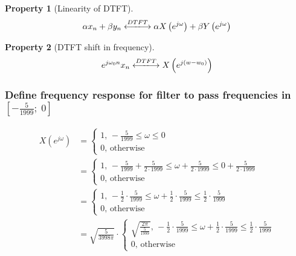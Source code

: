 \documentclass[a4paper]{article}
\theoremstyle{break}
\theoremstyle{break}
\newtheorem{property}{Property}[section]
\begin{document}
\begin{property}[Linearity of DTFT] \label{prop:dtft_lin}
  \begin{equation} \label{eq:dtft_lin}
    \alpha x_n + \beta y_n 
    \xlongleftrightarrow{DTFT}
    \alpha X \left( e^{j \omega} \right) + \beta Y \left( e^{j \omega} \right)
  \end{equation}
\end{property}

\begin{property}[DTFT shift in frequency] \label{prop:dtft_freq_shift}
  \begin{equation} \label{eq:dtft_freq_shift}
    e^{j \omega_0 n} x_n
    \xlongleftrightarrow{DTFT}
    X\left( e^{j (w - w_0)} \right)
  \end{equation}
\end{property}

\subsubsection*{Define frequency response for filter to pass frequencies in $\left[ -\frac{5}{1999}; \; 0 \right]$}

\begin{equation*}
  \begin{split}
    X(e^{j \omega}) &= \begin{cases}
                         1, \, -\frac{5}{1999} \leq \omega \leq 0 \\
                         0, \, \text{otherwise}
                       \end{cases} \\
                    &= \begin{cases}
                         1, \, -\frac{5}{1999} + \frac{5}{2 \cdot 1999} \leq \omega + \frac{5}{2 \cdot 1999} \leq 0 + \frac{5}{2 \cdot 1999} \\
                         0, \, \text{otherwise}
                       \end{cases} \\
                    &= \begin{cases}
                         1, \, - \frac{1}{2} \cdot \frac{5}{1999} \leq \omega + \frac{1}{2} \cdot \frac{5}{1999} \leq \frac{1}{2} \cdot \frac{5}{1999} \\
                         0, \, \text{otherwise}
                       \end{cases} \\
                    &= \sqrt{\frac{5}{3998 \pi}} \cdot
                       \begin{cases}
                         \sqrt{\frac{2 \pi}{\frac{5}{1999}}}, \, - \frac{1}{2} \cdot \frac{5}{1999} \leq \omega + \frac{1}{2} \cdot \frac{5}{1999} \leq \frac{1}{2} \cdot \frac{5}{1999} \\
                         0, \, \text{otherwise}
                       \end{cases}
  \end{split}
\end{equation*}
\end{document}
